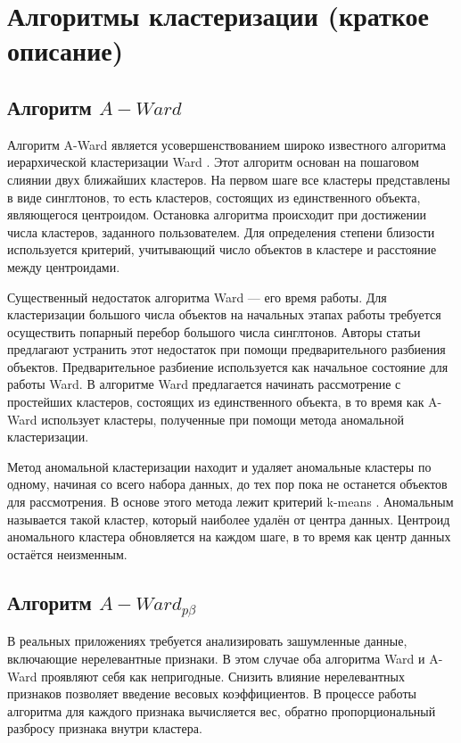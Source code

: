 \documentclass[12pt]{instruction}
\begin{document}
\section{Алгоритмы кластеризации (краткое описание)}
\label{sec:algs}
\subsection{Алгоритм $ A-Ward $}
\label{subsec:a-ward}
Алгоритм A-Ward является усовершенствованием  широко известного алгоритма иерархической кластеризации Ward \cite{ward}. Этот алгоритм основан на пошаговом слиянии двух ближайших кластеров. На первом шаге все кластеры представлены в виде синглтонов, то есть кластеров, состоящих из единственного объекта, являющегося центроидом. Остановка алгоритма происходит при достижении числа кластеров, заданного пользователем. Для определения степени близости используется критерий, учитывающий число объектов в кластере и расстояние между центроидами.

Существенный недостаток алгоритма Ward --- его время работы. Для кластеризации большого числа объектов на начальных этапах работы требуется осуществить попарный перебор большого числа синглтонов. Авторы статьи \cite{amorim} предлагают устранить этот недостаток при помощи предварительного разбиения объектов. Предварительное разбиение используется как начальное состояние для работы Ward. В алгоритме Ward предлагается начинать рассмотрение с простейших кластеров, состоящих из единственного объекта, в то время как A-Ward использует кластеры, полученные при помощи метода аномальной кластеризации. 

Метод аномальной кластеризации находит и удаляет аномальные кластеры по одному, начиная со всего набора данных, до тех пор пока не останется объектов для рассмотрения. В основе этого метода лежит критерий k-means \cite{k-means}. Аномальным называется такой кластер, который наиболее удалён от центра данных. Центроид аномального кластера обновляется на каждом шаге, в то время как центр данных остаётся неизменным.

\subsection{Алгоритм $ A-Ward_{p\beta} $}
В реальных приложениях требуется анализировать зашумленные данные, включающие нерелевантные признаки. В этом случае оба алгоритма Ward и A-Ward проявляют себя как непригодные. Снизить влияние нерелевантных признаков позволяет введение весовых коэффициентов. В процессе работы алгоритма для каждого признака вычисляется вес, обратно пропорциональный разбросу признака внутри кластера.
\end{document}
